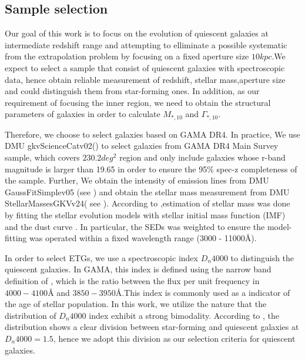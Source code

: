\documentclass[fleqn,usenatbib]{mnras}
\begin{document}
\subsection{Sample selection}
\par Our goal of this work is to focus on the evolution of quiescent galaxies at intermediate redshift range and attempting to elliminate a possible systematic from the extrapolation problem by focusing on a fixed aperture size $10kpc$.We expect to select a sample that consist of quiescent galaxies with spectroscopic data, hence obtain reliable measurement of redshift, stellar mass,aperture size and could distinguish them from star-forming ones. In addition, as our requirement of focusing the inner region, we need to obtain the structural parameters of galaxies in order to calculate $M_{*,10}$ and $\Gamma_{*,10}$.
\par Therefore, we choose to select galaxies based on GAMA DR4. 
In practice, We  use DMU gkvScienceCatv02(\cite{bellstedt_galaxy_2020}) to select galaxies from GAMA DR4 Main Survey sample, which covers $230.2 deg^2$ region and only include galaxies whose r-band magnitude is larger than 19.65 in order to ensure the 95\% spec-z completeness of the sample. Further, We obtain the intensity of emission lines from DMU GaussFitSimplev05 (see \cite{Gordon_GAMAspecline_2017}) and obtain the stellar mass measurement from DMU StellarMassesGKVv24( see \cite{GAMAmain}). According to \cite{Taylor2011},estimation of stellar mass was done by fitting the \cite{bruzual_2003} stellar evolution models with \cite{chabrier2003} stellar initial mass function (IMF) and the \cite{calzetti2000} dust curve . In particular, the SEDs was weighted to ensure the model-fitting was operated within a fixed wavelength range (3000 - 11000\r{A}). 
\par In order to select ETGs, we use a spectroscopic index $D_n4000$ to distinguish the quiescent galaxies. In GAMA, this index is defined using the narrow band definition of \cite{Balogh99}, which is the ratio between the flux per unit frequency in $4000-4100$\r{A} and $3850-3950$\r{A}.This index is commonly used as a indicator of the age of stellar population. In this work, we utilize the nature that the distribution of $D_n4000$ index exhibit a strong bimodality. According to \cite{Kauffmann2003}, the distribution shows a clear division between star-forming and quiescent galaxies at $D_n4000 = 1.5$, hence we adopt this division as our selection criteria for quiescent galaxies. 
\end{document}

